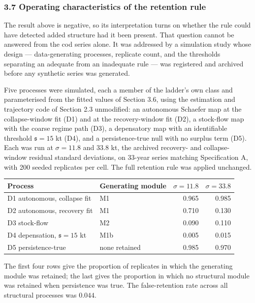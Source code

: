 \documentclass[11pt]{article}
\begin{document}
\subsubsection{3.7 Operating characteristics of the retention
rule}\label{operating-characteristics}

The result above is negative, so its interpretation turns on whether the
rule could have detected added structure had it been present. That
question cannot be answered from the cod series alone. It was addressed
by a simulation study whose design --- data-generating processes,
replicate count, and the thresholds separating an adequate from an
inadequate rule --- was registered and archived before any synthetic
series was generated.

Five processes were simulated, each a member of the ladder's own class
and parameterised from the fitted values of Section 3.6, using the
estimation and trajectory code of Section 2.3 unmodified: an autonomous
Schaefer map at the collapse-window fit (D1) and at the recovery-window
fit (D2), a stock-flow map with the coarse regime path (D3), a
depensatory map with an identifiable threshold \(\mathfrak s = 15\) kt
(D4), and a persistence-true null with no surplus term (D5). Each was
run at \(\sigma = 11.8\) and \(33.8\) kt, the archived recovery- and
collapse-window residual standard deviations, on 33-year series matching
Specification A, with 200 seeded replicates per cell. The full retention
rule was applied unchanged.

\begin{longtable}[]{@{}llrr@{}}
\toprule\noalign{}
Process & Generating module & \(\sigma=11.8\) & \(\sigma=33.8\) \\
\midrule\noalign{}
\endhead
\bottomrule\noalign{}
\endlastfoot
D1 autonomous, collapse fit & M1 & 0.965 & 0.985 \\
D2 autonomous, recovery fit & M1 & 0.710 & 0.130 \\
D3 stock-flow & M2 & 0.090 & 0.110 \\
D4 depensation, \(\mathfrak s=15\) kt & M1b & 0.005 & 0.015 \\
D5 persistence-true & none retained & 0.985 & 0.970 \\
\end{longtable}

The first four rows give the proportion of replicates in which the
generating module was retained; the last gives the proportion in which
no structural module was retained when persistence was true. The
false-retention rate across all structural processes was \(0.044\).
\end{document}
